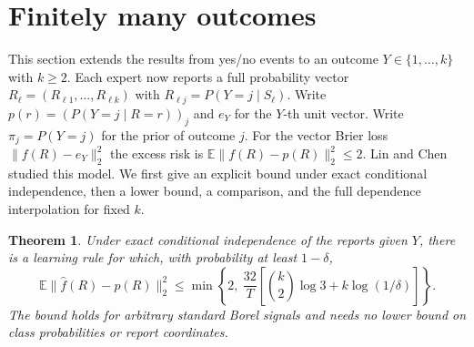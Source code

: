 \documentclass[11pt,a4paper]{article}
\newtheorem{theorem}{Theorem}
\theoremstyle{remark}
\newcommand{\E}{\mathbb E}
\begin{document}
\section{Finitely many outcomes}\label{sec:multi}
This section extends the results from yes/no events to an outcome $Y\in\{1,\ldots,k\}$ with $k\ge2$. Each expert now reports a full probability vector $R_\ell=(R_{\ell1},\ldots,R_{\ell k})$ with $R_{\ell j}=P(Y=j\mid S_\ell)$. Write $p(r)=(P(Y=j\mid R=r))_j$ and $e_Y$ for the $Y$-th unit vector. Write $\pi_j=P(Y=j)$ for the prior of outcome $j$. For the vector Brier loss $\|f(R)-e_Y\|_2^2$ the excess risk is $\E\|f(R)-p(R)\|_2^2\le2$. Lin and Chen~\cite[Section~6 and Appendix~E]{lc} studied this model. We first give an explicit bound under exact conditional independence, then a lower bound, a comparison, and the full dependence interpolation for fixed $k$.

\begin{theorem}\label{th:multi}
Under exact conditional independence of the reports given $Y$, there is a learning rule for which, with probability at least $1-\delta$,
\[
 \E\|\widehat f(R)-p(R)\|_2^2
 \le \min\!\left\{2,\ \frac{32}{T}
 \left[\binom{k}{2}\log3+k\log(1/\delta)\right]\right\}.
\]
The bound holds for arbitrary standard Borel signals and needs no lower bound on class probabilities or report coordinates.
\end{theorem}
\end{document}
